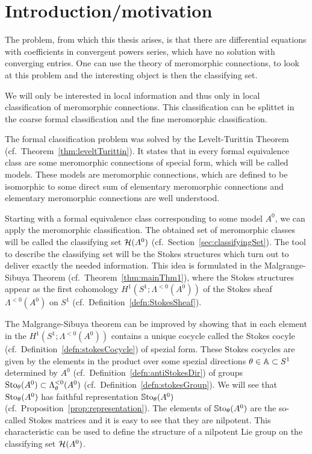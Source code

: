 \chapter{Introduction/motivation}

The problem, from which this thesis arises, is that there are differential
equations  with coefficients in convergent
powers series, which have no solution with converging entries.
One can use the theory of meromorphic connections, to look at this problem and
the interesting object is then the classifying set.


We will only be interested in local information and thus only in local
classification of meromorphic connections.
This classification can be splittet in the coarse formal classification and the
fine meromorphic classification.

The formal classification problem was solved by the Levelt-Turittin Theorem
(cf.\ Theorem~\ref{thm:leveltTurittin}). It states that in every formal
equivalence class are some meromorphic connections of special form, which will
be called models.
These models are meromorphic connections, which are defined to be isomorphic to
some direct sum of elementary meromorphic connections and elementary
meromorphic connections are well understood.

Starting with a formal equivalence class corresponding to some model $A^0$, we
can apply the meromorphic classification.
The obtained set of meromorphic classes will be called the classifying set
$\mathcal{H}(A^0)$ (cf.\ Section~\ref{sec:classifyingSet}).
The tool to describe the classifying set will be the Stokes structures which
turn out to deliver exactly the needed information.
This idea is formulated in the Malgrange-Sibuya Theorem
(cf.\ Theorem~\ref{thm:mainThm1}), where the Stokes structures appear as the
first cohomology $H^1(S^1;\Lambda^{<0}(A^0))$ of the Stokes sheaf
$\Lambda^{<0}(A^0)$ on $S^1$ (cf.\ Definition~\ref{defn:StokesSheaf}).

The Malgrange-Sibuya theorem can be improved by showing that in each element
in the $H^1(S^1;\Lambda^{<0}(A^0))$ contains a unique cocycle called the Stokes
cocyle (cf.\ Definition~\ref{defn:stokesCocycle}) of spezial form.
These Stokes cocycles are given by the elements in the product over some
spezial directions $\theta\in\mathbb{A}\subset S^1$ determined by $A^0$
(cf.\ Definition~\ref{defn:antiStokesDir}) of groups
$\operatorname{Sto}_\theta(A^0)\subset\Lambda_\theta^{<0}(A^0)$
(cf.\ Definition~\ref{defn:stokesGroup}).
We will see that $\operatorname{Sto}_\theta(A^0)$ has faithful representation
$\operatorname{\mathbb{S}to}_\theta(A^0)$ (cf.\ Proposition~\ref{prop:representation}).
The elements of $\operatorname{\mathbb{S}to}_\theta(A^0)$ are the so-called Stokes matrices and it is
easy to see that they are nilpotent.
This characteristic can be used to define the structure of a nilpotent Lie
group on the classifying set $\mathcal{H}(A^0)$.

